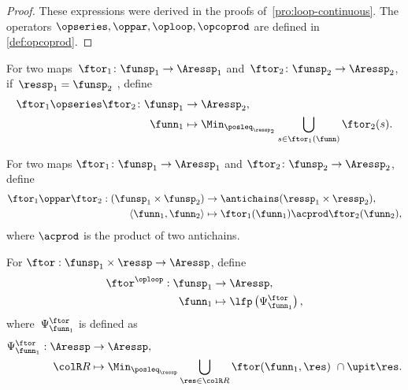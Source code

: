 \begin{proof}
These expressions were derived in the proofs of~\textendash \ref{pro:loop-continuous}.
 The operators $\opseries,\oppar,\oploop,\opcoprod$ are defined
in \textendash \ref{def:opcoprod}. 
\end{proof}
\begin{definition}
\label{def:opseries}For two maps~$\ftor_{1}\colon\funsp_{1}\rightarrow\Aressp_{1}$
and~$\ftor_{2}\colon\funsp_{2}\rightarrow\Aressp_{2}$, if~$\ressp_{1}=\funsp_{2}$
, define
\begin{align*}
{\displaystyle \ftor_{1}\opseries\ftor_{2}\colon\funsp_{1}} & \rightarrow\Aressp_{2},\\
\funn_{1} & \mapsto\Min_{\posleq_{\ressp_{2}}}\bigcup_{s\in\ftor_{1}(\funn)}\ftor_{2}(s).
\end{align*}
\end{definition}

\begin{definition}
\label{def:opmaps}For two maps $\ftor_{1}\colon\funsp_{1}\rightarrow\Aressp_{1}$
and $\ftor_{2}\colon\funsp_{2}\rightarrow\Aressp_{2}$, define
\begin{align}
\ftor_{1}\oppar\ftor_{2}:(\funsp_{1}\times\funsp_{2}) & \rightarrow\antichains(\ressp_{1}\times\ressp_{2}),\label{eq:oppar}\\
\left\langle \funn_{1},\funn_{2}\right\rangle  & \mapsto\ftor_{1}(\funn_{1})\acprod\ftor_{2}(\funn_{2}),\nonumber 
\end{align}
where $\acprod$ is the product of two antichains.
\end{definition}

\begin{definition}
\label{def:oploop}For $\ftor:\funsp_{1}\times\ressp\rightarrow\Aressp$,
define
\begin{align}
\ftor^{\oploop}:\funsp_{1} & \rightarrow\Aressp,\nonumber \\
\funn_{1} & \mapsto\lfp\left(\Psi_{\funn_{1}}^{\ftor}\right),\label{eq:lfp}
\end{align}
where~$\Psi_{\funn_{1}}^{\ftor}$ is defined as
\begin{align}
\Psi_{\funn_{1}}^{\ftor}:\Aressp & \rightarrow\Aressp,\nonumber \\
{\colR R} & \mapsto\Min_{\posleq_{\ressp}}\bigcup_{\res\in{\colR R}}\ftor(\funn_{1},\res)\ \cap\upit\res.\label{eq:phi}
\end{align}
\end{definition}


